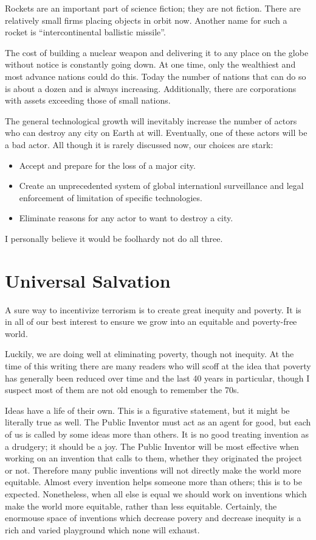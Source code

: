 \documentclass[
	fontsize=10pt, %
	twoside=false, %
	secnumdepth=1, %
]{kaobook}
\begin{document}
Rockets are an important part of science fiction;
they are not fiction. There are relatively small firms
placing objects in orbit now. Another name for such a
rocket is ``intercontinental ballistic missile''.

The cost of building a nuclear weapon and delivering it
to any place on the globe without notice is constantly
going down. At one time, only the wealthiest and most
advance nations could do this. Today the number of
nations that can do so is about a dozen and is always
increasing. Additionally, there are corporations with
assets exceeding those of small nations.

The general technological growth will inevitably
increase the number of actors who can destroy any city
on Earth at will.
Eventually, one of these actors will be a bad actor.
All though it is rarely discussed now, our choices are
stark:
\begin{itemize}
\item Accept and prepare for the loss of a major city.
\item Create an unprecedented system of global internationl
  surveillance and legal enforcement of limitation of
  specific technologies.
\item Eliminate reasons for any actor to want to destroy
  a city.
\end{itemize}
I personally believe it would be foolhardy not do
all three.

\chapter{Universal Salvation}

A sure way to incentivize terrorism is to create
great inequity and poverty.
It is in all of our best interest to ensure
we grow into an equitable and poverty-free world.

Luckily, we are doing well at eliminating poverty,
though not inequity.
At the time of this
writing there are many readers who will scoff at the
idea that poverty has generally been reduced over time
and the last 40 years in particular\cite{Pinker2019}, though I suspect most
of them are not old enough to remember the 70s.

Ideas have a life of their own.
This is a figurative statement, but it might be literally
true as well.
The Public Inventor must act as an agent for good, but
each of us is called by some ideas more than others.
It is no good treating invention as a drudgery; it should be a joy.
The Public Inventor will be most effective when working on an invention that calls to them,
whether they originated the project or not.
Therefore many public inventions will not directly make the world more equitable.
Almost every invention helps someone more than others; this is to be
expected.
Nonetheless, when all else is equal we should work on inventions which
make the world more equitable, rather than less equitable.
Certainly, the enormouse space of inventions which decrease povery
and decrease inequity is a rich and varied playground which
none will exhaust.
\end{document}
